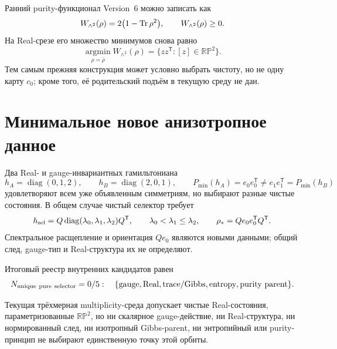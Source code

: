 Ранний purity-функционал Version~6 можно записать как
\begin{equation}
 W_{\wedge^2}(\rho)=2\bigl(1-\operatorname{Tr}\rho^2\bigr),
 \qquad W_{\wedge^2}(\rho)\geq0.
 \label{eq:v8-baryon-c0-exterior-square-purity-functional}
\end{equation}
На Real-срезе его множество минимумов снова равно
\begin{equation}
 \operatorname*{argmin}_{\rho=\overline\rho}W_{\wedge^2}(\rho)
 =\{zz^{\mathsf T}:[z]\in\mathbb{RP}^2\}.
 \label{eq:v8-baryon-c0-purity-functional-rp2-minima}
\end{equation}
Тем самым прежняя конструкция может условно выбрать чистоту, но не одну
карту $c_0$; кроме того, её родительский подъём в текущую среду не дан.

\section{Минимальное новое анизотропное данное}

Два Real- и gauge-инвариантных гамильтониана
\begin{equation}
 h_A=\operatorname{diag}(0,1,2),
 \qquad h_B=\operatorname{diag}(2,0,1),
 \qquad
 P_{\min}(h_A)=e_0e_0^{\mathsf T}\ne e_1e_1^{\mathsf T}=P_{\min}(h_B)
 \label{eq:v8-baryon-c0-anisotropic-hamiltonian-witnesses}
\end{equation}
удовлетворяют всем уже объявленным симметриям, но выбирают разные чистые
состояния. В общем случае чистый селектор требует
\begin{equation}
 h_{\rm sel}=Q\operatorname{diag}(\lambda_0,\lambda_1,\lambda_2)Q^{\mathsf T},
 \qquad \lambda_0<\lambda_1\leq\lambda_2,
 \qquad \rho_*=Qe_0e_0^{\mathsf T}Q^{\mathsf T}.
 \label{eq:v8-baryon-c0-minimal-pure-state-hamiltonian-data}
\end{equation}
Спектральное расщепление и ориентация $Qe_0$ являются новыми данными; общий
след, gauge-тип и Real-структура их не определяют.

Итоговый реестр внутренних кандидатов равен
\begin{equation}
 N_{\rm unique\ pure\ selector}=0/5:
 \quad\{\text{gauge},\text{Real},\text{trace/Gibbs},
 \text{entropy},\text{purity parent}\}.
 \label{eq:v8-baryon-c0-pure-state-selector-ledger}
\end{equation}

\begin{theorem}
Текущая трёхмерная multiplicity-среда допускает чистые Real-состояния,
параметризованные $\mathbb{RP}^2$, но ни скалярное gauge-действие, ни
Real-структура, ни нормированный след, ни изотропный Gibbs-parent, ни
энтропийный или purity-принцип не выбирают единственную точку этой орбиты.
\end{theorem}

